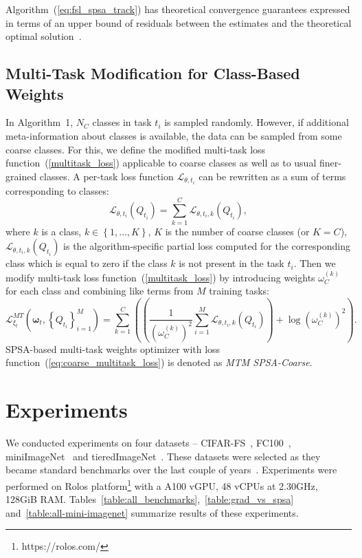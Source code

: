 \documentclass{article}
\begin{document}
Algorithm~(\ref{eq:fsl_spsa_track}) has theoretical convergence guarantees expressed in terms of an upper bound of residuals between the estimates and the theoretical optimal solution~\cite{granichin2014simultaneous}.
\subsection{Multi-Task Modification for Class-Based Weights}

In Algorithm~1, $N_C$ classes in task $t_i$ is sampled randomly. However, if additional meta-information about classes is available, the data can be sampled from some coarse classes. For this, we define the modified multi-task loss function~(\ref{multitask_loss}) applicable to coarse classes as well as to usual finer-grained classes. A per-task loss function $\mathcal{L}_{\theta, t_i}$ can be rewritten as a sum of terms corresponding to classes:
\begin{equation*}
\mathcal{L}_{\theta, t_i} (Q_{t_i}) = \sum_{k=1}^{C} \mathcal{L}_{\theta, t_i, k} (Q_{t_i}),
\end{equation*}
where $k$ is a class, $k \in \left\lbrace 1,\ldots, K \right\rbrace$, $K$ is the number of coarse classes (or $K = C$), $\mathcal{L}_{\theta, t_i, k} (Q_{t_i})$ is the algorithm-specific partial loss computed for the corresponding class which is equal to zero if the class $k$ is not present in the task $t_i$. Then we modify multi-task loss function~(\ref{multitask_loss}) by introducing weights $\omega_C^{(k)}$ for each class and combining like terms from $M$ training tasks:
\begin{equation}\label{eq:coarse_multitask_loss}
\mathcal{L}^{MT}_{\xi_t}(\boldsymbol{\omega}_t, \left\lbrace Q_{t_i} \right\rbrace_{i=1}^{M}) = \sum_{k=1}^C \left( \left( \frac{1}{(\omega_C^{(k)})^2} \sum_{i=1}^{M} \mathcal{L}_{\theta, t_i, k} (Q_{t_i}) \right) +  \log (\omega_C^{(k)})^2\right).
\end{equation}
SPSA-based multi-task weights optimizer with loss function~(\ref{eq:coarse_multitask_loss}) is denoted as {\it MTM SPSA-Coarse}.

\section{Experiments}

We conducted experiments on four datasets -- CIFAR-FS~\cite{bertinetto2018metalearning}, FC100~\cite{NEURIPS2018_66808e32}, miniImageNet~\cite{vinyals2016matching} and tieredImageNet~\cite{ren2018metalearning}. These datasets were selected as they became standard benchmarks over the last couple of years~\cite{Dhillon2020A, tian2020rethinking}. Experiments were performed on Rolos platform\footnote[1]{https://rolos.com/} with a A100 vGPU, 48 vCPUs at 2.30GHz, 128GiB RAM. Tables~\ref{table:all_benchmarks},~\ref{table:grad_vs_spsa} and~\ref{table:all-mini-imagenet} summarize results of these experiments.
\end{document}
